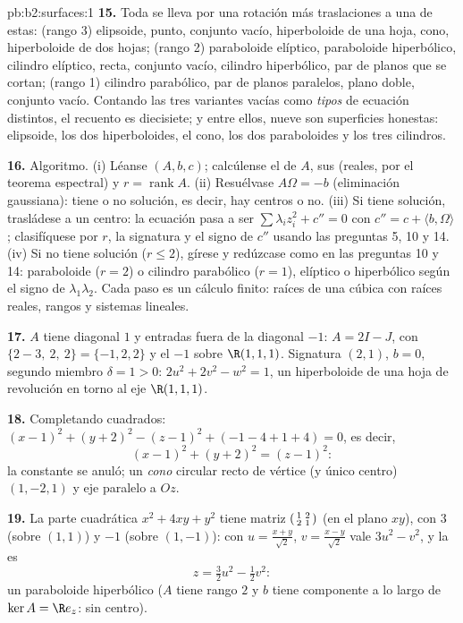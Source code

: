 \begin{solution}{pb:b2:surfaces:1}
\textbf{15.} Toda  se lleva por una rotación más
traslaciones a una de estas: (rango 3) elipsoide, punto, conjunto
vacío, hiperboloide de una hoja, cono, hiperboloide de dos hojas;
(rango 2) paraboloide elíptico, paraboloide hiperbólico, cilindro
elíptico, recta, conjunto vacío, cilindro hiperbólico, par de planos
que se cortan; (rango 1) cilindro parabólico, par de planos
paralelos, plano doble, conjunto vacío. Contando las tres variantes
vacías como \emph{tipos } de ecuación distintos, el recuento es
diecisiete; y entre ellos, nueve son superficies honestas:
elipsoide, los dos hiperboloides, el cono, los dos paraboloides y los
tres cilindros.

\textbf{16.} Algoritmo. (i) Léanse $(A, b, c)$; calcúlense el
 de $A$, sus  (reales, por el
teorema espectral) y $r = \operatorname{rank}A$. (ii) Resuélvase
$A\Omega = -b$ (eliminación gaussiana): tiene o no solución, es
decir, hay centros o no. (iii) Si tiene solución, trasládese a un
centro: la ecuación pasa a ser $\sum\lambda_iz_i^2 + c'' = 0$ con
$c'' = c + \langle b, \Omega\rangle$; clasifíquese por $r$, la
signatura y el signo de $c''$ usando las preguntas 5, 10 y 14. (iv)
Si no tiene solución ($r \leq 2$), gírese y redúzcase como en las
preguntas 10 y 14: paraboloide ($r = 2$) o cilindro parabólico ($r =
1$), elíptico o hiperbólico según el signo de $\lambda_1\lambda_2$.
Cada paso es un cálculo finito: raíces de una cúbica con raíces
reales, rangos y sistemas lineales.

\textbf{17.} $A$ tiene diagonal $1$ y entradas fuera de la diagonal
$-1$: $A = 2I - J$, con  $\{2 - 3,\ 2,\ 2\} = \{-1, 2, 2\}$
y el $-1$ sobre $\R(1,1,1)$. Signatura $(2,1)$, $b = 0$, segundo
miembro $\delta = 1 > 0$: $2u^2 + 2v^2 - w^2 = 1$, un hiperboloide de
una hoja de revolución en torno al eje $\R(1,1,1)$.

\textbf{18.} Completando cuadrados: $(x-1)^2 + (y+2)^2 - (z-1)^2 +
(-1 - 4 + 1 + 4) = 0$, es decir,
\[
(x-1)^2 + (y+2)^2 = (z-1)^2 :
\]
la constante se anuló; un \emph{cono} circular recto de vértice (y
único centro) $(1, -2, 1)$ y eje paralelo a $Oz$.

\textbf{19.} La parte cuadrática $x^2 + 4xy + y^2$ tiene matriz
$\begin{psmallmatrix}1 & 2\\ 2 & 1\end{psmallmatrix}$ (en el plano
$xy$), con  $3$ (sobre $(1,1)$) y $-1$ (sobre
$(1,-1)$): con $u = \frac{x+y}{\sqrt2}$, $v = \frac{x-y}{\sqrt2}$
vale $3u^2 - v^2$, y la  es
\[
z = \tfrac32u^2 - \tfrac12v^2 :
\]
un paraboloide hiperbólico ($A$ tiene rango $2$ y $b$ tiene
componente a lo largo de $\ker A = \R e_z$: sin centro).


\end{solution}
